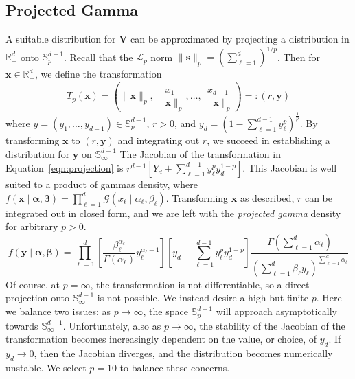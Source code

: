 \subsection{Projected Gamma\label{ref:pg}}
A suitable distribution for $\bm{V}$ can be approximated by projecting a 
    distribution in $\mathbb{R}_+^d$ onto $\mathbb{S}_{p}^{d-1}$.  
    Recall that the $\mathcal{L}_p$ norm 
    $\lVert \bm{s}\rVert_p = \left(\sum_{\ell = 1}^d\right)^{1/p}$.  Then
    for $\bm{x}\in\mathbb{R}_+^d$, we define the transformation
    \begin{equation}
        \label{eqn:projection}
        T_p(\bm{x}) = \left(\lVert \bm{x}\rVert_p, 
            \frac{x_1}{\lVert \bm{x}\rVert_p},\ldots, 
                \frac{x_{d-1}}{\lVert \bm{x}\rVert_p}\right)
                =: (r,\bm{y})
    \end{equation}
    where $y = (y_1,\ldots,y_{d-1}) \in \mathbb{S}_{p}^{d-1}$, $r > 0$, and 
    $y_d = \left(1 - \sum_{\ell = 1}^{d-1}y_{\ell}^p\right)^{\frac{1}{p}}$.
    By transforming $\bm{x}$ to $(r,\bm{y})$ and integrating out $r$, we
    succeed in establishing a distribution for $\bm{y}$ on 
    $\mathbb{S}_{\infty}^{d-1}$
    The Jacobian of the transformation in Equation~\eqref{eqn:projection} is
    $r^{d-1}\left[Y_d + \sum_{\ell = 1}^{d-1}y_{\ell}^py_d^{1-p}\right]$.
    This Jacobian is well suited to a product of gammas density, where 
    $f(\bm{x}\mid\bm{\alpha},\bm{\beta}) = 
        \prod_{\ell = 1}^d\mathcal{G}(x_{\ell}\mid\alpha_{\ell},\beta_{\ell})$.
    Transforming $\bm{x}$ as described, $r$ can be integrated out in closed
    form, and we are left with the \emph{projected gamma} density for arbitrary 
    $p > 0$.
    \[
        f(\bm{y}\mid\bm{\alpha},\bm{\beta}) = \prod_{\ell = 1}^d\left[
            \frac{\beta_{\ell}^{\alpha_{\ell}}}{\Gamma(\alpha_{\ell})}
            y_{\ell}^{\alpha_{\ell} - 1}\right]
            \left[y_d + \sum_{\ell = 1}^{d-1}y_{\ell}^py_d^{1-p}\right]
            \frac{\Gamma(\sum_{\ell = 1}^d \alpha_{\ell})}{\left(
                \sum_{\ell = 1}^d\beta_{\ell}y_{\ell}
                \right)^{\sum_{\ell = 1}^d \alpha_{\ell}}
            }
    \]
    Of course, at $p=\infty$, the transformation is not differentiable, so a 
    direct projection onto $\mathbb{S}_{\infty}^{d-1}$ is not possible. We
    instead desire a high but finite $p$.
    Here we balance two issues: as $p\to\infty$, the space $\mathbb{S}_{p}^{d-1}$ 
    will approach asymptotically towards $\mathbb{S}_{\infty}^{d-1}$.
    Unfortunately, also as $p\to\infty$, the stability of the Jacobian of the
    transformation becomes increasingly dependent on the value, or choice, of 
    $y_d$.  If $y_d\to 0$, then the Jacobian diverges, and the distribution 
    becomes numerically unstable. We select $p = 10$ to balance these concerns.

